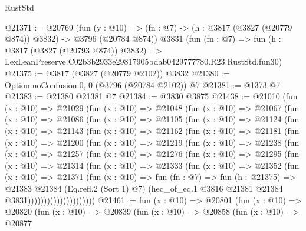 \begin{lexlean}{RustStd}
\begin{coremodule}
@21371 := @20769
    (fun (y : @10) => (fn : @7) -> (h : @3817 (@3827 (@20779 @874)) @3832) -> @3796 (@20784 @874))
    @3831
    (fun (fn : @7) =>
    fun (h : @3817 (@3827 (@20793 @874)) @3832) =>
    LexLeanPreserve.C02b3b2933e29817905bdab0429777780.R23.RustStd.fun30)
@21375 := @3817 (@3827 (@20779 @2102)) @3832
@21380 := Option.noConfusion.{0, 0} (@3796 (@20784 @2102)) @7
@21381 := @1373 @7
@21383 := @21380 @21381 @7
@21384 := @3830 @3875
@21438 := @21010
    (fun (x : @10) =>
    @21029
      (fun (x : @10) =>
      @21048
        (fun (x : @10) =>
        @21067
          (fun (x : @10) =>
          @21086
            (fun (x : @10) =>
            @21105
              (fun (x : @10) =>
              @21124
                (fun (x : @10) =>
                @21143
                  (fun (x : @10) =>
                  @21162
                    (fun (x : @10) =>
                    @21181
                      (fun (x : @10) =>
                      @21200
                        (fun (x : @10) =>
                        @21219
                          (fun (x : @10) =>
                          @21238
                            (fun (x : @10) =>
                            @21257
                              (fun (x : @10) =>
                              @21276
                                (fun (x : @10) =>
                                @21295
                                  (fun (x : @10) =>
                                  @21314
                                    (fun (x : @10) =>
                                    @21333
                                      (fun (x : @10) =>
                                      @21352
                                        (fun (x : @10) =>
                                        @21371
                                          (fun (x : @10) =>
                                          fun (fn : @7) =>
                                          fun (h : @21375) =>
                                          @21383
                                            @21384
                                            (Eq.refl.{2} (Sort 1) @7)
                                            (heq_of_eq.{1}
                                              @3816
                                              @21381
                                              @21384
                                              @3831)))))))))))))))))))))
@21461 := fun (x : @10) =>
  @20801
    (fun (x : @10) =>
    @20820
      (fun (x : @10) =>
      @20839
        (fun (x : @10) =>
        @20858
          (fun (x : @10) =>
          @20877

\end{coremodule}
\end{lexlean}
